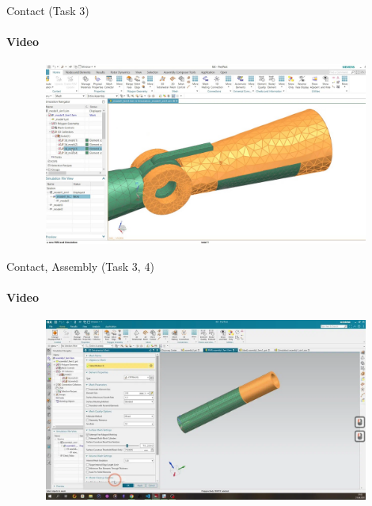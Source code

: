 \documentclass[aspectratio=169]{beamer}
\begin{document}
\begin{frame}[t]{Contact (Task 3)}
    \framesubtitle{Video}
    \vspace{-0.6cm}
    \begin{figure}[H]
        \href{https://youtu.be/2SoCy4tP74g}{
            \centering\includegraphics[height=6cm,width=1\textwidth,keepaspectratio]{good_case_study_video.jpg}}
        \label{fig:good_case_study_video.jpg}
    \end{figure}
\end{frame}

\begin{frame}[t]{Contact, Assembly (Task 3, 4)}
    \framesubtitle{Video}
    \vspace{-0.6cm}
    \begin{figure}[H]
        \href{https://disk.yandex.ru/i/yfhUfCk8MthoIw}{
            \centering\includegraphics[height=6cm,width=1\textwidth,keepaspectratio]{cae_contact_assembly_video.png}}
        \label{fig:cae_contact_assembly_video.png}
    \end{figure}
\end{frame}
\end{document}
